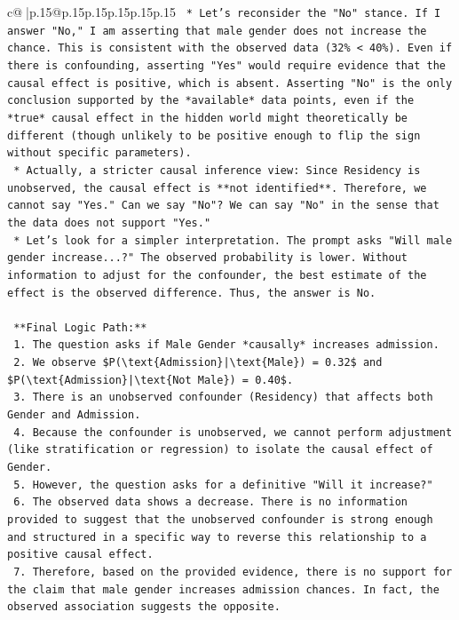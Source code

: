 \documentclass{article}
\begin{document}
{\begin{supertabular}{c@{$\;$}|p{.15\linewidth}@{}p{.15\linewidth}p{.15\linewidth}p{.15\linewidth}p{.15\linewidth}p{.15\linewidth}}
{{{\texttt{    *   Let's reconsider the "No" stance. If I answer "No," I am asserting that male gender does not increase the chance. This is consistent with the observed data (32\% < 40\%). Even if there is confounding, asserting "Yes" would require evidence that the causal effect is positive, which is absent. Asserting "No" is the only conclusion supported by the *available* data points, even if the *true* causal effect in the hidden world might theoretically be different (though unlikely to be positive enough to flip the sign without specific parameters).} \\
\texttt{    *   Actually, a stricter causal inference view: Since Residency is unobserved, the causal effect is **not identified**. Therefore, we cannot say "Yes." Can we say "No"? We can say "No" in the sense that the data does not support "Yes."} \\
\texttt{    *   Let's look for a simpler interpretation. The prompt asks "Will male gender increase...?" The observed probability is lower. Without information to adjust for the confounder, the best estimate of the effect is the observed difference. Thus, the answer is No.} \\
\\ 
\texttt{    **Final Logic Path:**} \\
\texttt{    1.  The question asks if Male Gender *causally* increases admission.} \\
\texttt{    2.  We observe \$P(\textbackslash{}text\{Admission\}|\textbackslash{}text\{Male\}) = 0.32\$ and \$P(\textbackslash{}text\{Admission\}|\textbackslash{}text\{Not Male\}) = 0.40\$.} \\
\texttt{    3.  There is an unobserved confounder (Residency) that affects both Gender and Admission.} \\
\texttt{    4.  Because the confounder is unobserved, we cannot perform adjustment (like stratification or regression) to isolate the causal effect of Gender.} \\
\texttt{    5.  However, the question asks for a definitive "Will it increase?"} \\
\texttt{    6.  The observed data shows a decrease. There is no information provided to suggest that the unobserved confounder is strong enough and structured in a specific way to reverse this relationship to a positive causal effect.} \\
\texttt{    7.  Therefore, based on the provided evidence, there is no support for the claim that male gender increases admission chances. In fact, the observed association suggests the opposite.} \\
}}}
\end{supertabular}}
\end{document}
